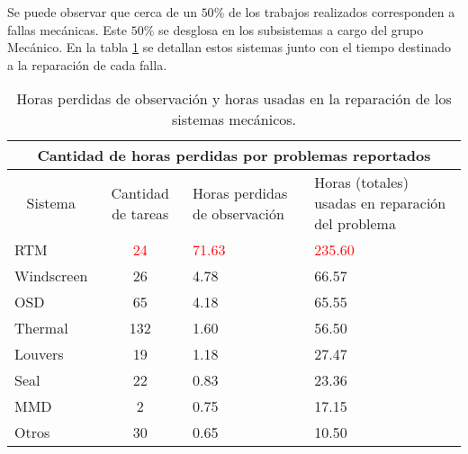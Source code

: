             Se puede observar que cerca de un $50\%$ de los trabajos realizados corresponden a fallas mecánicas. Este $50\%$ se desglosa en los subsistemas a cargo del grupo Mecánico. En la tabla \ref{tab:PPRSmec} se detallan estos sistemas junto con el tiempo destinado a la reparación de cada falla.
            \begin{table}[H]
                \centering
                \caption{Horas perdidas de observación y horas usadas en la reparación de los sistemas mecánicos.}
                \label{tab:PPRSmec}
                \begin{tabular}{|l|c|p{4cm}|p{4cm}|}
                \hline
                \multicolumn{4}{|c|}{Cantidad de horas perdidas por problemas reportados}                                                              \\ \hline \hline
                \multicolumn{1}{|c|}{Sistema} & Cantidad de tareas & Horas perdidas de observación & Horas (totales) usadas en reparación del problema \\ \hline 
                RTM                           & \textcolor{red}{24}& \textcolor{red}{71.63}        & \textcolor{red}{235.60}  \\ \hline
                Windscreen                    & 26                 & 4.78                          & 66.57                                             \\ \hline
                OSD                           & 65                 & 4.18                          & 65.55                                             \\ \hline
                Thermal                       & 132                & 1.60                          & 56.50                                             \\ \hline
                Louvers                       & 19                 & 1.18                          & 27.47                                             \\ \hline
                Seal                          & 22                 & 0.83                          & 23.36                                             \\ \hline
                MMD                           & 2                  & 0.75                          & 17.15                                             \\ \hline
                Otros                         & 30                 & 0.65                          & 10.50                                             \\ \hline

\end{tabular}
\end{table}
